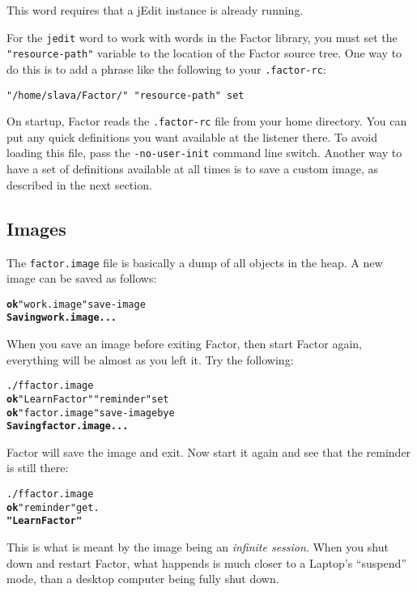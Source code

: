 \documentclass{article}
\begin{document}
This word requires that a jEdit instance is already running.

For the \texttt{jedit} word to work with words in the Factor library, you must set the \texttt{"resource-path"} variable to the location of the Factor source tree. One way to do this is to add a phrase like the following to your \texttt{.factor-rc}:

\begin{verbatim}
"/home/slava/Factor/" "resource-path" set
\end{verbatim}

On startup, Factor reads the \texttt{.factor-rc} file from your home directory. You can put
any quick definitions you want available at the listener there. To avoid loading this
file, pass the \texttt{-no-user-init} command line switch. Another way to have a set of definitions available at all times is to save a custom image, as described in the next section.

\subsection{Images}

The \texttt{factor.image} file is basically a dump of all objects in the heap. A new image can be saved as follows:

\begin{alltt}
\textbf{ok} "work.image" save-image
\textbf{Saving work.image...}
\end{alltt}

When you save an image before exiting Factor, then start Factor again, everything will be almost as you left it. Try the following:

\begin{alltt}
./f factor.image
\textbf{ok} "Learn Factor" "reminder" set
\textbf{ok} "factor.image" save-image bye
\textbf{Saving factor.image...}
\end{alltt}

Factor will save the image and exit. Now start it again and see that the reminder is still there:

\begin{alltt}
./f factor.image
\textbf{ok} "reminder" get .
\textbf{"Learn Factor"}
\end{alltt}

This is what is meant by the image being an \emph{infinite session}. When you shut down and restart Factor, what happends is much closer to a Laptop's ``suspend'' mode, than a desktop computer being fully shut down.
\end{document}
